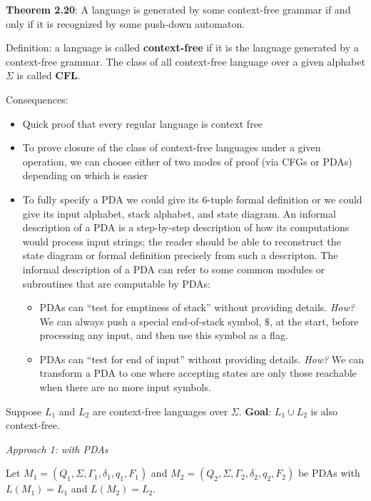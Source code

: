 \documentclass[12pt, oneside]{article}
\begin{document}
{\bf Theorem  2.20}: A language is  generated by some context-free  grammar
if  and only if it is recognized by some push-down automaton.

Definition: a language is called {\bf context-free} if it is the language generated by a context-free grammar.
The class of all context-free language over a given alphabet $\Sigma$ is called {\bf CFL}.

Consequences:
\begin{itemize}
    \item Quick proof that every regular language is context free 
    \item To prove closure of the class of context-free languages under a given operation, we can choose 
    either of two modes 
    of proof (via CFGs or PDAs) depending on which is easier
    \item To fully specify a PDA we could give its $6$-tuple formal definition or we could give its input 
alphabet, stack alphabet, and state diagram.
An informal description of a PDA is a step-by-step description of how its computations 
would process input strings; the reader should be able to reconstruct the state diagram or formal 
definition precisely from such a descripton. The informal description of a PDA can refer to some 
common modules or subroutines that are computable by PDAs:
\begin{itemize}
  \item PDAs can ``test for emptiness of stack'' without providing details. 
  {\it How?} We can always push a special end-of-stack symbol, $\$$, at the start, before processing
  any input, and then use this symbol as a flag.
  \item PDAs can ``test for end of input'' without providing details.
  {\it How?} We can transform a PDA to one where accepting states are only those reachable 
  when there are no more input symbols.
\end{itemize}

\end{itemize}




\vfill

\newpage
Suppose $L_1$ and $L_2$ are context-free languages over $\Sigma$.  {\bf Goal}:  $L_1 \cup L_2$  is  also context-free.

{\it Approach 1: with  PDAs}

Let $M_1 = ( Q_1, \Sigma, \Gamma_1, \delta_1, q_1, F_1)$ and
$M_2 = ( Q_2, \Sigma, \Gamma_2, \delta_2, q_2, F_2)$ be PDAs with 
$L(M_1) =  L_1$  and  $L(M_2) = L_2$.
\end{document}
